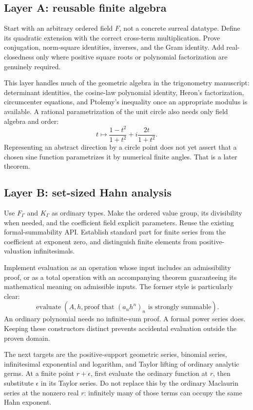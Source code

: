 \documentclass[11pt,letterpaper]{article}
\numberwithin{equation}{section}
\theoremstyle{definition}
\theoremstyle{remark}
\begin{document}
\subsection{Layer A: reusable finite algebra}
Start with an arbitrary ordered field $F$, not a concrete surreal datatype. Define its quadratic extension with the correct cross-term multiplication. Prove conjugation, norm-square identities, inverses, and the Gram identity. Add real-closedness only where positive square roots or polynomial factorization are genuinely required.

This layer handles much of the geometric algebra in the trigonometry manuscript: determinant identities, the cosine-law polynomial identity, Heron's factorization, circumcenter equations, and Ptolemy's inequality once an appropriate modulus is available. A rational parametrization of the unit circle also needs only field algebra and order:
\[
 t\longmapsto\frac{1-t^2}{1+t^2}+i\frac{2t}{1+t^2}.
\]
Representing an abstract direction by a circle point does not yet assert that a chosen sine function parametrizes it by numerical finite angles. That is a later theorem.

\subsection{Layer B: set-sized Hahn analysis}
Use $F_\Gamma$ and $K_\Gamma$ as ordinary types. Make the ordered value group, its divisibility when needed, and the coefficient field explicit parameters. Reuse the existing formal-summability API. Establish standard part for finite series from the coefficient at exponent zero, and distinguish finite elements from positive-valuation infinitesimals.

Implement evaluation as an operation whose input includes an admissibility proof, or as a total operation with an accompanying theorem guaranteeing its mathematical meaning on admissible inputs. The former style is particularly clear:
\[
 \operatorname{evaluate}(A,h,\text{proof that }(a_nh^n)_n\text{ is strongly summable}).
\]
An ordinary polynomial needs no infinite-sum proof. A formal power series does. Keeping these constructors distinct prevents accidental evaluation outside the proven domain.

The next targets are the positive-support geometric series, binomial series, infinitesimal exponential and logarithm, and Taylor lifting of ordinary analytic germs. At a finite point $r+\epsilon$, first evaluate the ordinary function at $r$, then substitute $\epsilon$ in its Taylor series. Do not replace this by the ordinary Maclaurin series at the nonzero real $r$: infinitely many of those terms can occupy the same Hahn exponent.
\end{document}
